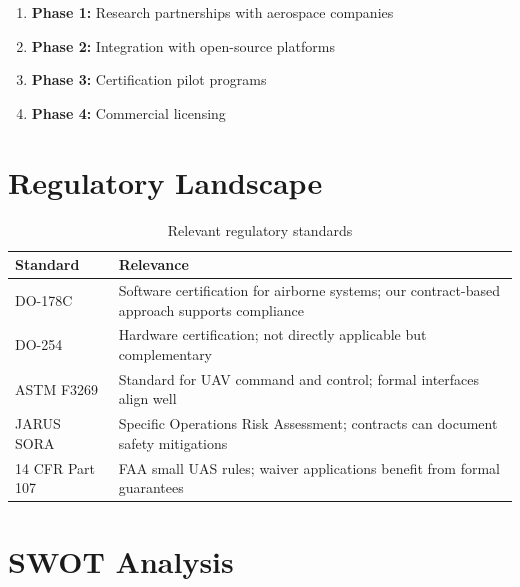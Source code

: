\begin{enumerate}
    \item \textbf{Phase 1:} Research partnerships with aerospace companies
    \item \textbf{Phase 2:} Integration with open-source platforms
    \item \textbf{Phase 3:} Certification pilot programs
    \item \textbf{Phase 4:} Commercial licensing
\end{enumerate}

\section{Regulatory Landscape}

\begin{table}[htbp]
    \centering
    \caption{Relevant regulatory standards}
    \label{tab:regulations}
    \begin{tabular}{@{}p{3cm}p{9cm}@{}}
        \toprule
        \textbf{Standard} & \textbf{Relevance} \\
        \midrule
        DO-178C & Software certification for airborne systems; our contract-based approach supports compliance \\
        DO-254 & Hardware certification; not directly applicable but complementary \\
        ASTM F3269 & Standard for UAV command and control; formal interfaces align well \\
        JARUS SORA & Specific Operations Risk Assessment; contracts can document safety mitigations \\
        14 CFR Part 107 & FAA small UAS rules; waiver applications benefit from formal guarantees \\
        \bottomrule
    \end{tabular}
\end{table}

\section{SWOT Analysis}

